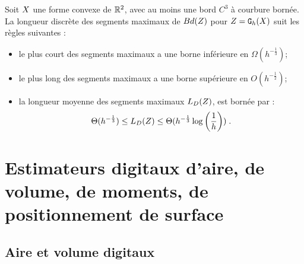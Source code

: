 \begin{lemma}
  \label{lem:law-length-MDSS}
  Soit $X$ une forme convexe de $\mathbb{R}^2$, avec au moins une bord $C^3$ à
  courbure bornée. La longueur discrète des segments maximaux de
  $Bd({Z})$ pour $Z = \mathtt{G}_{h}(X)$ suit les règles suivantes :
  \begin{itemize}
    \item le plus court des segments maximaux a une borne inférieure en
    $\Omega(h^{-\frac{1}{3}})$;
    \item le plus long des segments maximaux a une borne supérieure en
    $O(h^{-\frac{1}{2}})$;
    \item la longueur moyenne des segments maximaux $L_D({Z})$, est bornée par :
    \begin{equation}
      \label{eq:lengthMS}
      \Theta(h^{-\frac{1}{3}}) \le L_D( {Z} ) \le \Theta(h^{-\frac{1}{3}} \log \left(\frac{1}{h}\right))\;.
    \end{equation}
  \end{itemize}
\end{lemma}
%
\section{Estimateurs digitaux d'aire, de volume, de moments, de positionnement de surface}
%
\subsection{Aire et volume digitaux}
%
